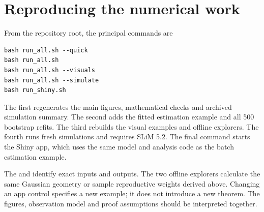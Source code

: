 \section{Reproducing the numerical work}
\label{worked:commands}

From the repository root, the principal commands are
\begin{verbatim}
bash run_all.sh --quick
bash run_all.sh
bash run_all.sh --visuals
bash run_all.sh --simulate
bash run_shiny.sh
\end{verbatim}
The first regenerates the main figures, mathematical checks and archived simulation summary. The second adds the fitted estimation example and all 500 bootstrap refits. The third rebuilds the visual examples and offline explorers. The fourth runs fresh simulations and requires SLiM 5.2. The final command starts the Shiny app, which uses the same model and analysis code as the batch estimation example.

The  and
 identify exact inputs and outputs.
The two offline explorers calculate the same Gaussian geometry or sample reproductive weights derived above. Changing an app control specifies a new example; it does not introduce a new theorem. The figures, observation model and proof assumptions should be interpreted together.
